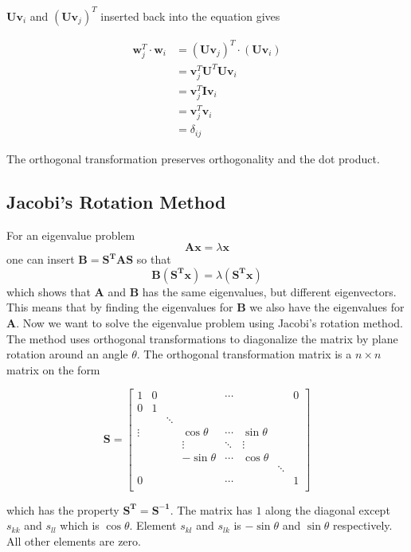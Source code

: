 \documentclass{article}
\begin{document}
$\mathbf{Uv}_i$ and $(\mathbf{Uv}_j)^T$ inserted back into the equation gives

\begin{equation*}
\begin{split}
\mathbf{w}_j^T\cdot \mathbf{w}_i&=(\mathbf{Uv}_j)^T\cdot (\mathbf{Uv}_i)\\
&=\mathbf{v}_j^T\mathbf{U}^T\mathbf{Uv}_i\\
&=\mathbf{v}_j^T\mathbf{I}\mathbf{v}_i\\
&=\mathbf{v}_j^T\mathbf{v}_i\\
&=\delta_{ij}
\end{split}
\end{equation*}

The orthogonal transformation preserves orthogonality and the dot product.

\subsection{Jacobi's Rotation Method}
For an eigenvalue problem
$$\mathbf{Ax}=\lambda\mathbf{x}$$
one can insert $\mathbf{B}=\mathbf{S^TAS}$ so that
$$\mathbf{B(S^Tx)}=\lambda(\mathbf{S^Tx})$$
which shows that $\mathbf{A}$ and $\mathbf{B}$ has the same eigenvalues, but different eigenvectors. This means that by finding the eigenvalues for $\mathbf{B}$ we also have the eigenvalues for $\mathbf{A}$.
\vskip0.5cm
Now we want to solve the eigenvalue problem using Jacobi's rotation method. The method uses orthogonal transformations to diagonalize the matrix by plane rotation around an angle $\theta$. The orthogonal transformation matrix is a $n\times n$ matrix on the form

\begin{equation*}
\mathbf{S}=\begin{bmatrix}
1 & 0 & & & \cdots & & & 0\\
0 & 1 & & & & & \\
 &  &\ddots & & & & &\\
\vdots &  & & \cos\theta & \cdots & \sin\theta & &\\
 & & &\vdots & \ddots & \vdots & &\\
 & & & -\sin\theta & \cdots & \cos\theta & & \\
 & & & & & & \ddots & \\
0 &  & & & \cdots  & & & 1\\
\end{bmatrix}
\end{equation*}

which has the property $\mathbf{S^T}=\mathbf{S^{-1}}$. The matrix has $1$ along the diagonal except $s_{kk}$ and $s_{ll}$ which is $\cos\theta$. Element $s_{kl}$ and $s_{lk}$ is $-\sin\theta$ and $\sin\theta$ respectively. All other elements are zero.
\end{document}
